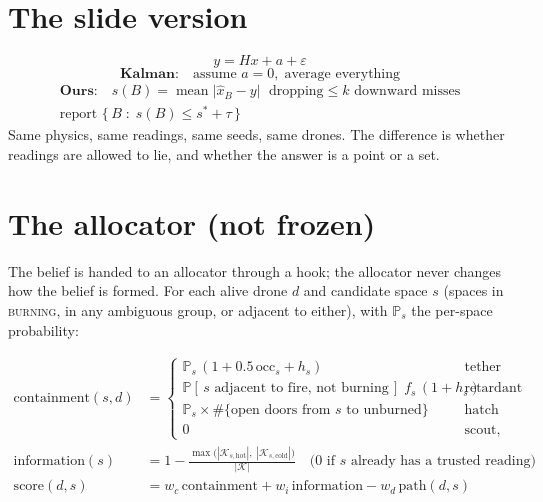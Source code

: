 \documentclass[11pt]{article}
\newcommand{\xhat}{\hat{x}}
\newcommand{\Kset}{\mathcal{K}}
\begin{document}
\section{The slide version}

\begin{keybox}
\centering
\begin{minipage}{0.94\linewidth}
\[
  y = Hx + a + \varepsilon
\]
\[
  \textbf{Kalman:}\quad \text{assume } a = 0, \;\text{average everything}
\]
\begin{gather*}
  \textbf{Ours:}\quad
  s(B) = \operatorname{mean}\bigl|\xhat_B - y\bigr|
  \;\text{ dropping} \le k \text{ downward misses} \\[2pt]
  \text{report } \bigl\{\, B \;:\; s(B) \le s^{*} + \tau \,\bigr\}
\end{gather*}
\vspace{2pt}
\centering\small
Same physics, same readings, same seeds, same drones. The difference is whether readings are allowed to lie,
and whether the answer is a point or a set.
\end{minipage}
\end{keybox}

\section{The allocator (not frozen)}

The belief is handed to an allocator through a hook; the allocator never changes how the belief is formed. For each alive drone $d$ and candidate space $s$ (spaces in \textsc{burning}, in any ambiguous group, or adjacent to either), with $\mathbb{P}_s$ the per-space probability:

\begin{align}
  \mathrm{containment}(s, d) &=
  \begin{cases}
    \mathbb{P}_s\,(1 + 0.5\,\mathrm{occ}_s + h_s) & \text{tether} \\
    \mathbb{P}[\,s \text{ adjacent to fire, not burning}\,]\; f_s\,(1 + h_s) & \text{retardant} \\
    \mathbb{P}_s \times \#\{\text{open doors from } s \text{ to unburned}\} & \text{hatch} \\
    0 & \text{scout, relay}
  \end{cases} \\[4pt]
  \mathrm{information}(s) &= 1 - \frac{\max\bigl(|\Kset_{s,\mathrm{hot}}|,\; |\Kset_{s,\mathrm{cold}}|\bigr)}{|\Kset|}
  \quad \text{(0 if } s \text{ already has a trusted reading)} \\[4pt]
  \mathrm{score}(d, s) &= w_c\,\mathrm{containment} + w_i\,\mathrm{information} - w_d\,\mathrm{path}(d, s)
\end{align}
\end{document}
